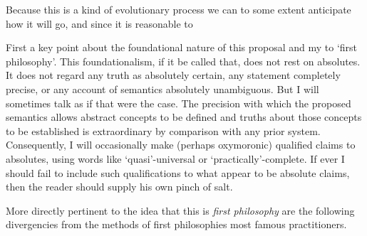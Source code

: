Because this is a kind of evolutionary process we can to some extent anticipate how it will go, and since it is reasonable to 


First a key point about the foundational nature of this proposal and my  to `first philosophy'.
This foundationalism, if it be called that, does not rest on absolutes.
It does not regard any truth as absolutely certain, any statement completely precise, or any account of semantics absolutely unambiguous.
But I will sometimes talk as if that were the case.
The precision with which the proposed semantics allows abstract concepts to be defined and truths about those concepts to be established is extraordinary by comparison with any prior system.
Consequently, I will occasionally make (perhaps oxymoronic) qualified claims to absolutes, using words like `quasi'-universal or `practically'-complete.
If ever I should fail to include such qualifications to what appear to be absolute claims, then the reader should supply his own pinch of salt.

More directly pertinent to the idea that this is \emph{first philosophy} are the following divergencies from the methods of first philosophies most famous practitioners.


